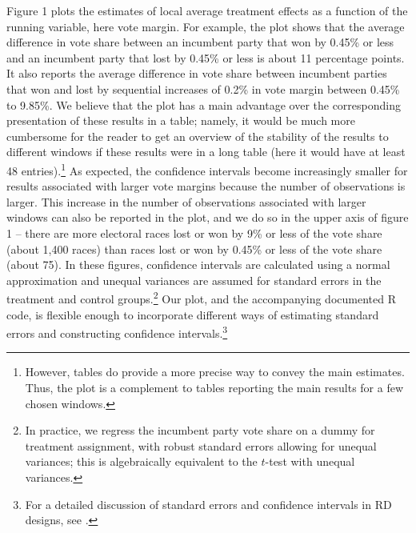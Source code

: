 \documentclass[letterpaper,twoside,12pt]{article}
\begin{document}
Figure 1 plots the estimates of local average treatment effects as a function of the running variable, here vote margin. For example, the plot shows that the average difference in vote share between an incumbent party that won by 0.45\% or less and an incumbent party that lost by 0.45\% or less is about 11 percentage points. It also reports the average difference in vote share between incumbent parties that won and lost by sequential increases of 0.2\% in vote margin between 0.45\% to 9.85\%.  We believe that the plot has a main advantage over the corresponding presentation of these results in a table; namely, it would be much more cumbersome for the reader to get an overview of the stability of the results to different windows if these results were in a long table (here it would have at least 48 entries).\footnote{However, tables do provide a more precise way to convey the main estimates. Thus, the plot is a complement to tables reporting the main results for a few chosen windows.} As expected, the confidence intervals become increasingly smaller for results associated with larger vote margins because the number of observations is larger. This increase in the number of observations associated with larger windows can also be reported in the plot, and we do so in the upper axis of figure 1 -- there are more electoral races lost or won by 9\% or less of the vote share (about 1,400 races) than races lost or won by 0.45\% or less of the vote share (about 75). In these figures, confidence intervals are calculated using a normal approximation and unequal variances are assumed for standard errors in the treatment and control groups.\footnote{In practice, we regress the incumbent party vote share on a dummy for treatment assignment, with robust standard errors allowing for unequal variances; this is algebraically equivalent to the $t$-test with unequal variances.} Our plot, and the accompanying documented R code, is flexible enough to incorporate different ways of estimating standard errors and constructing confidence intervals.\footnote{For a detailed discussion of standard errors and confidence intervals in RD designs, see \citet{calonico2015robust}.}
\end{document}
